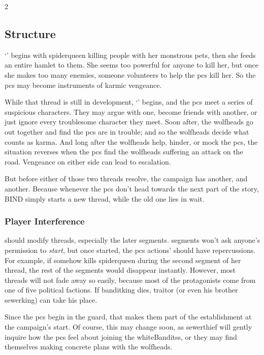 \begin{multicols}{2}


\subsection{Structure}

`' begins with \gls{spiderqueen} killing people with her monstrous pets, then she feeds an entire hamlet to them.
She seems too powerful for anyone to kill her, but once she makes too many enemies, someone volunteers to help the \glspl{pc} kill her.
So the \glspl{pc} may become instruments of karmic vengeance.

While that thread is still in development, `' begins, and the \glspl{pc} meet a series of suspicious characters.
They may argue with one, become friends with another, or just ignore every troublesome character they meet.
Soon after, the \glspl{wolfhead} go out together and find the \glspl{pc} are in trouble; and so the \glspl{wolfhead} decide what counts as karma.
And long after the \glspl{wolfhead} help, hinder, or mock the \glspl{pc}, the situation reverses when the \glspl{pc} find the \glspl{wolfhead} suffering an attack on the road.
Vengeance on either side can lead to escalation.

But before either of those two threads resolve, the \gls{campaign} has another, and another.
Because whenever the \glspl{pc} don't head towards the next part of the story, BIND simply starts a new \gls{thread}, while the old one lies in wait.

\subsubsection{Player Interference}
should modify \glspl{thread}, especially the later \glspl{segment}.
\Glspl{segment} won't ask anyone's permission to \textit{start}, but once started, the \glspl{pc} actions' should have repercussions.
For example, if  somehow kills \gls{spiderqueen} during the second \gls{segment} of her \gls{thread}, the rest of the \glspl{segment} would disappear instantly.
However, most \glspl{thread} will not fade away so easily, because most of the protagonists come from one of five political factions.
If \gls{banditking} dies, \gls{traitor} (or even his brother \gls{sewerking}) can take his place.

Since the \glspl{pc} begin in the \gls{guard}, that makes them part of the establishment at the \gls{campaign}'s start.
Of course, this may change soon, as \gls{sewerthief} will gently inquire how the \glspl{pc} feel about joining the \glspl{whiteBandits}, or they may find themselves making concrete plans with the \glspl{wolfhead}.


\end{multicols}
